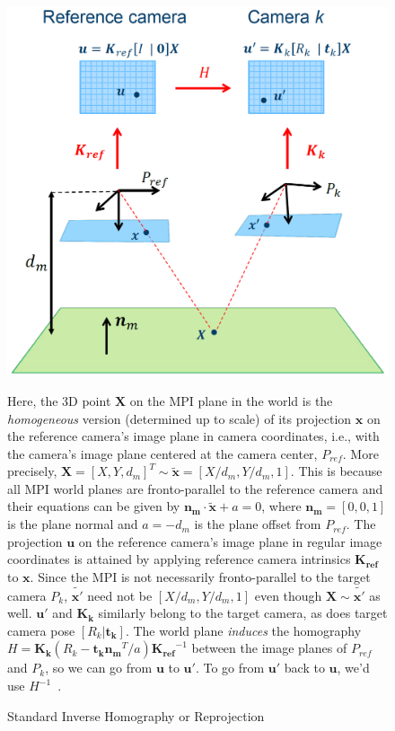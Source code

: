 \begin{figure}[!h]
    \includegraphics[width=0.75\columnwidth]{figures/standard-inverse-homography.png}
    \caption{Standard Inverse Homography or Reprojection~\cite{brann_forelesninger_2016}}
    \label{fig:standard-inverse-homography}
    {\small Here, the 3D point $\mathbf{X}$ on the MPI plane in the world is the \textit{homogeneous} version (determined up to scale) of its projection $\mathbf{x}$ on the reference camera's image plane in camera coordinates, i.e., with the camera's image plane centered at the camera center, $P_{ref}$. More precisely, $\mathbf{X} = [X,Y,d_m]^T \sim \tilde{\mathbf{x}} = [X/d_m,Y/d_m,1]$. This is because all MPI world planes are fronto-parallel to the reference camera and their equations can be given by $\mathbf{n_m \cdot \tilde{x}} + a = 0$, where $\mathbf{n_m} = [0,0,1]$ is the plane normal and $a = -d_m$ is the plane offset from $P_{ref}$. The projection $\mathbf{u}$ on the reference camera's image plane in regular image coordinates is attained by applying reference camera intrinsics $\mathbf{K_{ref}}$ to $\mathbf{x}$. Since the MPI is not necessarily fronto-parallel to the target camera $P_k$, $\tilde{\mathbf{x'}}$ need not be $[X/d_m,Y/d_m,1]$ even though $\mathbf{X} \sim \tilde{\mathbf{x'}}$ as well. $\mathbf{u'}$ and $\mathbf{K_k}$ similarly belong to the target camera, as does target camera pose $[R_k|\mathbf{t_k}]$. The world plane \textit{induces} the homography $H = \mathbf{K_k} (R_k - \mathbf{t_k} \mathbf{n_m}^T / a) \mathbf{K_{ref}}^{-1}$ between the image planes of $P_{ref}$ and $P_k$, so we can go from $\mathbf{u}$ to $\mathbf{u'}$. To go from $\mathbf{u'}$ back to $\mathbf{u}$, we'd use $H^{-1}$~\cite{zikuicai_derivation_2019}.}  
\end{figure}

